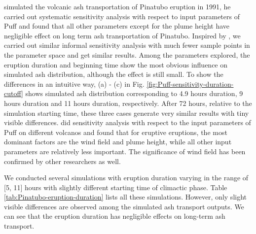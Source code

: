 \documentclass[utf8]{frontiersSCNS} %
\begin{document}
\citet{fero2008simulation} simulated the volcanic ash transportation of Pinatubo eruption in 1991, he carried out systematic sensitivity analysis with respect to input parameters of Puff and found that all other parameters except for the plume height have negligible effect on long term ash transportation of Pinatubo. Inspired by \citet{fero2008simulation}, we carried out similar informal sensitivity analysis with much fewer sample points in the parameter space and get similar results. Among the parameters explored, the eruption duration and beginning time show the most obvious influence on simulated ash distribution, although the effect is still small. To show the differences in an intuitive way, (a) - (c) in Fig. \ref{fig:Puff-sensitivity-duration-cutoff} shows simulated ash distribution corresponding to 4.9 hours duration, 9 hours duration and 11 hours duration, respectively. After 72 hours, relative to the simulation starting time, these three cases generate very similar results with tiny visible differences. \citet{daniele2009applications} did sensitivity analysis with respect to the input parameters of Puff on different volcanos and found that for eruptive eruptions, the most dominant factors are the wind field and plume height, while all other input parameters are relatively less important. The significance of wind field has been confirmed by other researchers \citep[e.g]{stefanescu2014fast} as well.

We conducted several simulations with eruption duration varying in the range of [5, 11] hours with slightly different starting time of climactic phase. Table \ref{tab:Pinatubo-eruption-duration} lists all these simulations. However, only slight visible differences are observed among the simulated ash transport outputs. We can see that the eruption duration has negligible effects on long-term ash transport.
\end{document}
